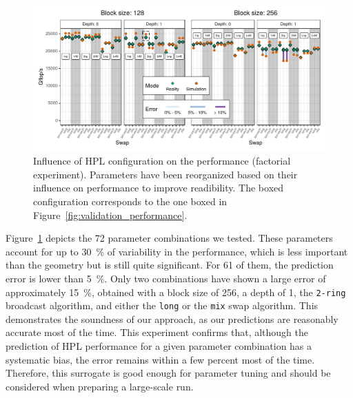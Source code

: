         \begin{figure}[htpb]
            \centering
            \includegraphics[width=\linewidth]{img/prediction/validation/factorial/validation_factorial.pdf}
            \caption{Influence of HPL configuration on the performance (factorial experiment). Parameters have been
                reorganized based on their influence on performance to improve readibility. The boxed configuration
                corresponds to the one boxed in Figure~\ref{fig:validation_performance}.
            }
            \label{fig:validation_factorial}
        \end{figure}

        Figure~\ref{fig:validation_factorial} depicts the 72 parameter combinations we tested. These parameters account
        for up to \SI{30}{\percent} of variability in the performance, which is less important than the geometry but is
        still quite significant. For 61 of them, the prediction error is lower than \SI{5}{\percent}. Only two
        combinations have shown a large error of approximately \SI{15}{\percent}, obtained with a block size of 256, a
        depth of 1, the \texttt{2-ring} broadcast algorithm, and either the \texttt{long} or the \texttt{mix} swap
        algorithm. This demonstrates the soundness of our approach, as our predictions are reasonably accurate most of
        the time.  This experiment confirms that, although the prediction of HPL performance for a given parameter
        combination has a systematic bias, the error remains within a few percent most of the time. Therefore, this
        surrogate is good enough for parameter tuning and should be considered when preparing a large-scale run.

